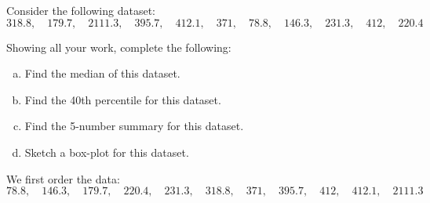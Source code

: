 \documentclass[11pt,letterpaper]{article}
\begin{document}

 Consider the following dataset:
	\[
	318.8, \quad 179.7, \quad 2111.3, \quad 395.7, \quad 412.1, \quad 371, \quad 78.8, \quad 146.3, \quad 231.3, \quad 412, \quad 220.4
	\]

Showing all your work, complete the following: 
        \begin{enumerate}[(a)]
        \item Find the median of this dataset. 
        \item Find the 40th percentile for this dataset. 
        \item Find the 5-number summary for this dataset. 
        \item Sketch a box-plot for this dataset. 
        \end{enumerate} \pspace

\sol We first order the data:
	\[
	78.8, \quad 146.3, \quad 179.7, \quad 220.4, \quad 231.3, \quad 318.8, \quad 371, \quad 395.7, \quad 412, \quad 412.1, \quad 2111.3
	\]
\end{document}
